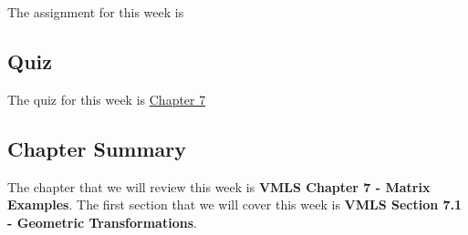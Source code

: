 The assignment for this week is   

\subsection{Quiz}

The quiz for this week is \href{https://applied.cs.colorado.edu/mod/quiz/view.php?id=50753}{Chapter 7} \textbullet {}  

\subsection{Chapter Summary}

The chapter that we will review this week is \textbf{VMLS Chapter 7 - Matrix Examples}. The first section that we will cover this week is \textbf{VMLS Section 7.1 - Geometric Transformations}.

